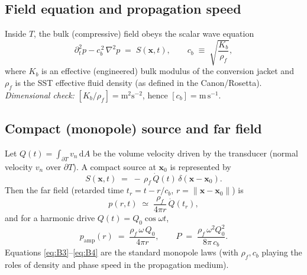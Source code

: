 \documentclass[10pt,reprint,aps,onecolumn,nofootinbib]{revtex4-2}
\begin{document}
    \subsection*{Field equation and propagation speed}
    Inside $T$, the bulk (compressive) field obeys the scalar wave equation
    \begin{equation}
        \partial_t^2 p - c_b^{\,2}\,\nabla^2 p \;=\; S(\mathbf{x},t),
        \qquad
        c_b \;\equiv\; \sqrt{\frac{K_b}{\rho_f}},
        \label{eq:B1}
    \end{equation}
    where $K_b$ is an effective (engineered) bulk modulus of the conversion jacket and $\rho_f$ is the SST effective fluid density (as defined in the Canon/Rosetta).
    \emph{Dimensional check:} $[K_b/\rho_f]=\mathrm{m}^2\mathrm{s}^{-2}$, hence $[c_b]=\mathrm{m\,s^{-1}}$.

    \subsection*{Compact (monopole) source and far field}
    Let $Q(t)=\int_{\partial T} v_n\,\mathrm{d}A$ be the volume velocity driven by the transducer (normal velocity $v_n$ over $\partial T$). A compact source at $\mathbf{x}_0$ is represented by
    \begin{equation}
        S(\mathbf{x},t)\;=\; -\,\rho_f\,\dot{Q}(t)\,\delta(\mathbf{x}-\mathbf{x}_0).
        \label{eq:B2}
    \end{equation}
    Then the far field (retarded time $t_r=t-r/c_b$, $r=\|\mathbf{x}-\mathbf{x}_0\|$) is
    \begin{equation}
        p(r,t) \;\simeq\; \frac{\rho_f}{4\pi r}\,\dot{Q}(t_r),
        \label{eq:B3}
    \end{equation}
    and for a harmonic drive $Q(t)=Q_0\cos\omega t$,
    \begin{equation}
        p_{\mathrm{amp}}(r)\;=\;\frac{\rho_f\,\omega\,Q_0}{4\pi r},
        \qquad
        P\;=\;\frac{\rho_f\,\omega^2 Q_0^2}{8\pi\,c_b}.
        \label{eq:B4}
    \end{equation}
    Equations \eqref{eq:B3}–\eqref{eq:B4} are the standard monopole laws (with $\rho_f,c_b$ playing the roles of density and phase speed in the propagation medium).
\end{document}
